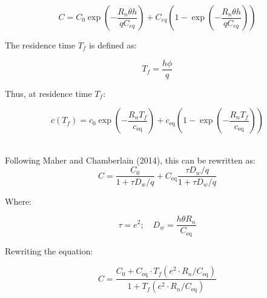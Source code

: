 \begin{tcolorbox}
{\begin{equation}
    C = C_0 \exp \left( -\frac{R_n \theta h}{q C_{eq}} \right) + C_{eq} \left( 1 - \exp \left( -\frac{R_n \theta h}{q C_{eq}} \right) \right)
\end{equation}

The residence time \( T_f \) is defined as:

\begin{equation}
    T_f = \frac{h \phi}{q}
\end{equation}

Thus, at residence time \( T_f \):

\begin{equation}
c(T_f) = c_0 \exp\left(-\frac{R_n T_f}{c_{\text{eq}}} \right) + c_{\text{eq}} \left( 1 - \exp\left(-\frac{R_n T_f}{c_{\text{eq}}} \right) \right)
\end{equation}\\


\begin{multicols}{2}

Following Maher and Chamberlain (2014), this can be rewritten as:
\columnbreak
\begin{equation}
    C =  \frac{C_{\text{0}}}{1 + \tau D_w / q} + C_{\text{eq}} \frac{\tau D_w / q}{1 + \tau D_w / q}
\end{equation}
    
\end{multicols}

\begin{multicols}{2}

Where:

\columnbreak
\begin{equation}
\tau = e^2; \quad D_w = \frac{h\theta R_n}{C_{\text{eq}}}
\end{equation}

\end{multicols}

\begin{multicols}{2}

Rewriting the equation:

\columnbreak

\begin{equation}
    C = \frac{C_{\text{0}} + C_{\text{eq}} \cdot T_f\left(e^2 \cdot R_n / C_{\text{eq}}\right)}{1 + T_f\left(e^2 \cdot R_n / C_{\text{eq}}\right)}
\end{equation}

\end{multicols}

}
\end{tcolorbox}
